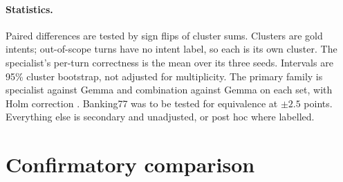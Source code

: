 \documentclass[11pt]{article}
\begin{document}
\paragraph{Statistics.} Paired differences are tested by sign flips of cluster sums. Clusters are gold intents; out-of-scope turns have no intent label, so each is its own cluster. The specialist's per-turn correctness is the mean over its three seeds. Intervals are 95\% cluster bootstrap, not adjusted for multiplicity. The primary family is specialist against Gemma and combination against Gemma on each set, with Holm correction \citep{holm1979}. Banking77 was to be tested for equivalence at $\pm2.5$ points. Everything else is secondary and unadjusted, or post hoc where labelled.

\section{Confirmatory comparison}
\label{sec:confirmatory}

\begin{table}[t]
\centering\small
{}
\caption{Pre-registered comparison. Specialist: mean of three seeds. Combination and cascade use Gemma. Jev and Qwen are secondary. The \emph{never seen} column is a post hoc sensitivity analysis (\cref{sec:freshness}), with Holm over the same six tests. The cascade calls Gemma on 40\% of turns, so its API cost is 40\% of the Gemma column, plus hosting the classifier; the combination calls it on every turn. Combination $-$ Gemma: $+0.58$, $+0.60$, $+0.10$ (Holm $\ge .40$).}
\label{tab:primary}
\end{table}
\end{document}
